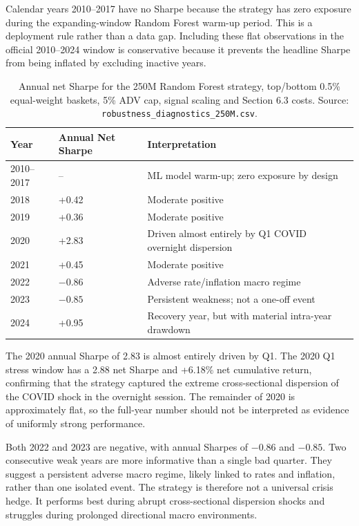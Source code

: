 \documentclass[12pt,a4paper]{article}
\begin{document}
Calendar years 2010--2017 have no Sharpe because the strategy has zero exposure
during the expanding-window Random Forest warm-up period. This is a deployment
rule rather than a data gap. Including these flat observations in the official
2010--2024 window is conservative because it prevents the headline Sharpe from
being inflated by excluding inactive years.

\begin{table}[H]
\centering
\caption{Annual net Sharpe for the 250M Random Forest strategy, top/bottom 0.5\% equal-weight baskets, 5\% ADV cap, signal scaling and Section 6.3 costs. Source: \texttt{robustness\_diagnostics\_250M.csv}.}
\label{tab:step5_annual_sharpe}
\small
\begin{tabular}{p{2.5cm} p{3.0cm} p{8.0cm}}
\toprule
\textbf{Year} & \textbf{Annual Net Sharpe} & \textbf{Interpretation} \\
\midrule
2010--2017 & -- & ML model warm-up; zero exposure by design \\
2018 & +0.42 & Moderate positive \\
2019 & +0.36 & Moderate positive \\
2020 & +2.83 & Driven almost entirely by Q1 COVID overnight dispersion \\
2021 & +0.45 & Moderate positive \\
2022 & $-0.86$ & Adverse rate/inflation macro regime \\
2023 & $-0.85$ & Persistent weakness; not a one-off event \\
2024 & +0.95 & Recovery year, but with material intra-year drawdown \\
\bottomrule
\end{tabular}
\end{table}

The 2020 annual Sharpe of 2.83 is almost entirely driven by Q1. The 2020 Q1
stress window has a 2.88 net Sharpe and +6.18\% net cumulative return,
confirming that the strategy captured the extreme cross-sectional dispersion of
the COVID shock in the overnight session. The remainder of 2020 is approximately
flat, so the full-year number should not be interpreted as evidence of uniformly
strong performance.

Both 2022 and 2023 are negative, with annual Sharpes of $-0.86$ and $-0.85$.
Two consecutive weak years are more informative than a single bad quarter. They
suggest a persistent adverse macro regime, likely linked to rates and inflation,
rather than one isolated event. The strategy is therefore not a universal crisis
hedge. It performs best during abrupt cross-sectional dispersion shocks and
struggles during prolonged directional macro environments.
\end{document}
